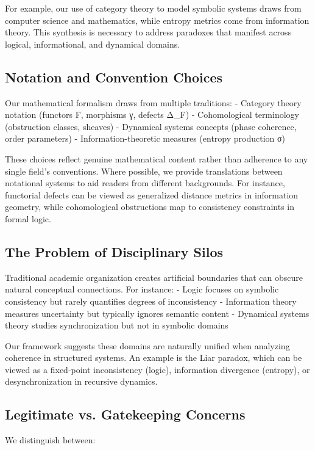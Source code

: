 \documentclass[12pt]{article}
\theoremstyle{plain}
\begin{document}
For example, our use of category theory to model symbolic systems draws from computer science and mathematics, while entropy metrics come from information theory. This synthesis is necessary to address paradoxes that manifest across logical, informational, and dynamical domains.

\subsection{Notation and Convention Choices}

Our mathematical formalism draws from multiple traditions:
- Category theory notation (functors F, morphisms γ, defects Δ_F)
- Cohomological terminology (obstruction classes, sheaves)
- Dynamical systems concepts (phase coherence, order parameters)
- Information-theoretic measures (entropy production σ)

These choices reflect genuine mathematical content rather than adherence to any single field's conventions. Where possible, we provide translations between notational systems to aid readers from different backgrounds. For instance, functorial defects can be viewed as generalized distance metrics in information geometry, while cohomological obstructions map to consistency constraints in formal logic.

\subsection{The Problem of Disciplinary Silos}

Traditional academic organization creates artificial boundaries that can obscure natural conceptual connections. For instance:
- Logic focuses on symbolic consistency but rarely quantifies degrees of inconsistency
- Information theory measures uncertainty but typically ignores semantic content
- Dynamical systems theory studies synchronization but not in symbolic domains

Our framework suggests these domains are naturally unified when analyzing coherence in structured systems. An example is the Liar paradox, which can be viewed as a fixed-point inconsistency (logic), information divergence (entropy), or desynchronization in recursive dynamics.

\subsection{Legitimate vs. Gatekeeping Concerns}

We distinguish between:
\end{document}
